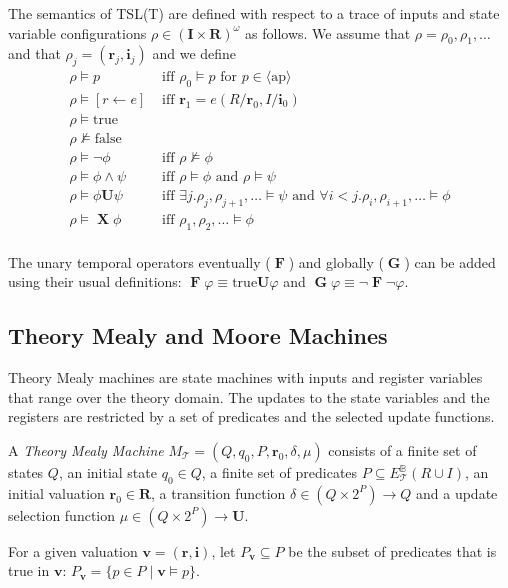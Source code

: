 \documentclass[runningheads]{llncs}
\newcommand{\eventually}{\operatorname{\mathbf{F}}}
\newcommand{\false}{\mathrm{false}}
\newcommand{\globally}{\operatorname{\mathbf{G}}}
\newcommand{\until}{\mathrel{\mathbf{U}}}
\newcommand{\lnext}{\operatorname{\mathbf{X}}}
\newcommand{\theory}{\mathcal{T}}
\newcommand{\updfs}{\mathbf{U}}
\newcommand{\rvar}{\mathbf{r}}
\newcommand{\rvars}{\mathbf{R}}
\newcommand{\ivar}{\mathbf{i}}
\newcommand{\ivars}{\mathbf{I}}
\newcommand{\true}{\mathrm{true}}
\newcommand{\bexpr}{E_\theory^\mathbb{B}(R \cup I)}
\newcommand{\nt}[1]{\langle\text{#1}\rangle}
\newcommand{\vvar}{\mathbf{v}}
\begin{document}
The semantics of TSL(T) are defined with respect to a trace of inputs and state variable configurations $\rho \in (\ivars \times \rvars)^\omega$ as follows. We assume that $\rho = \rho_0, \rho_1, \dots$ and that $\rho_j = (\rvar_j, \ivar_j)$ and we define
\begin{align*}
\rho \models p                 &\text{ iff } \rho_0 \models p \text{ for $p \in \nt{ap}$}\\
\rho \models [r \leftarrow e] &\text{ iff } \rvar_1= e(R/\rvar_0,I/\ivar_0) \\
\rho \models \true & \\
\rho \not\models \false & \\
\rho \models \neg \phi  &\text{ iff } \rho \not\models \phi\\
\rho \models \phi \wedge \psi  &\text{ iff } \rho \models \phi \text{ and } \rho \models \psi\\
\rho \models \phi \until \psi  &\text{ iff } \exists j. \rho_j, \rho_{j+1},\dots \models \psi \text{ and } \forall i<j. \rho_i,\rho_{i+1},\dots \models \phi \\
\rho \models \lnext \phi  &\text{ iff } \rho_1, \rho_2,\dots  \models \phi\\
\end{align*}

The unary temporal operators eventually ($\eventually$) and globally ($\globally$) can be added using their usual definitions: $\eventually \varphi \equiv \true \until \varphi$ and $\globally \varphi \equiv \neg \eventually \neg \varphi$.


\subsection{Theory Mealy and Moore Machines}
Theory Mealy machines are state machines with inputs and  register variables that range over the theory domain. The updates to the state variables and the registers are restricted by a set of predicates and the selected update functions.

A \emph{Theory Mealy Machine} $M_{\theory} = (Q, q_0, P, \rvar_0, \delta, \mu)$ consists of a finite set of states $Q$, an initial state $q_0 \in Q$, a finite set of predicates $P \subseteq \bexpr$, an initial valuation $\rvar_0 \in \rvars$, a transition function $\delta \in (Q \times 2^P) \to Q$ and a update selection function $\mu \in (Q \times 2^P) \to \updfs$.

For a given valuation $\vvar = (\rvar, \ivar)$, let $P_{\vvar}\subseteq P$ be the subset of predicates that is true in $\vvar$: $P_{\vvar} = \{p \in P \mid \vvar \models p\}$.
\end{document}
